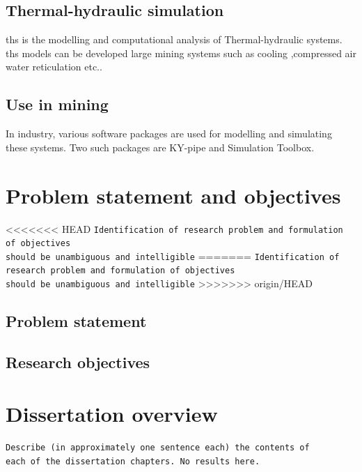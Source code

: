 \subsection{Thermal-hydraulic simulation}
\gls{ths} is the modelling and computational analysis of Thermal-hydraulic systems. \gls{ths} models can be developed large mining systems such as cooling ,compressed air water reticulation etc..\par

\subsection{Use in mining}
In industry, various software packages are used for modelling and simulating these systems. Two such packages are KY-pipe and Simulation Toolbox.

\section{Problem statement and objectives}
<<<<<<< HEAD
\texttt{Identification of research problem and formulation of objectives \\should be unambiguous and intelligible}
=======
\texttt{Identification of research problem and formulation of objectives\\ should be unambiguous and intelligible}
>>>>>>> origin/HEAD
\subsection{Problem statement}
\subsection{Research objectives}
\section{Dissertation overview}
\texttt{Describe (in approximately one sentence each) the contents of \\each of the dissertation chapters. No results here.}